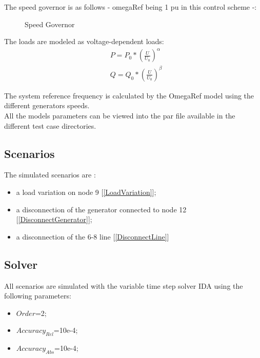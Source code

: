 \documentclass[a4paper, 12pt]{report}
\begin{document}
The speed governor is as follows - omegaRef being 1 pu in this control scheme -:
\begin{figure}[H]
\centering
{}
\caption{Speed Governor}
\end{figure}

The loads are modeled as voltage-dependent loads:
\begin{equation*}
\begin{aligned}
& P = P_{0} * (\frac{U}{U_{0}})^\alpha \\
& Q = Q_{0} * (\frac{U}{U_{0}})^\beta
\end{aligned}
\label{Voltage-dependent load model}
\end{equation*}

The system reference frequency is calculated by the OmegaRef model using the different generators speeds.\\

All the models parameters can be viewed into the par file available in the different test case directories.

\subsection{Scenarios}
The simulated scenarios are :
\begin{itemize}
\item a load variation on node 9 [\ref{LoadVariation}];
\item a disconnection of the generator connected to node 12 [\ref{DisconnectGenerator}];
\item a disconnection of the 6-8 line [\ref{DisconnectLine}]
\end{itemize}

\subsection{Solver}
All scenarios are simulated with the variable time step solver IDA using the following parameters:
\begin{itemize}
\item $Order$=2;
\item $Accuracy_{Rel}$=10e-4;
\item $Accuracy_{Abs}$=10e-4;
\end{itemize}
\end{document}
